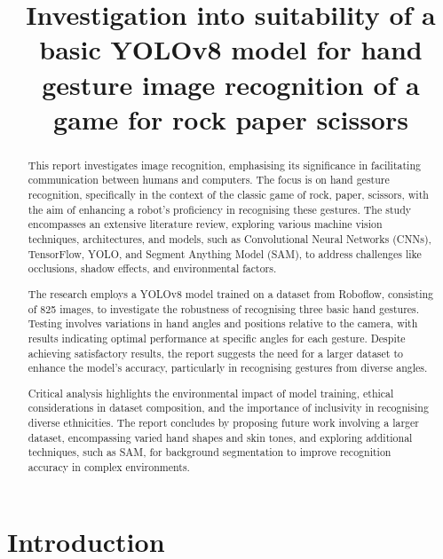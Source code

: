 \documentclass[conference]{IEEEtran}
\begin{document}
\title{Investigation into suitability of a basic YOLOv8 model for hand gesture image recognition of a game for rock paper scissors}

\author{
}

\maketitle

\begin{abstract}
This report investigates image recognition, emphasising its significance in facilitating communication between humans and computers. The focus is on hand gesture recognition, specifically in the context of the classic game of rock, paper, scissors, with the aim of enhancing a robot's proficiency in recognising these gestures. The study encompasses an extensive literature review, exploring various machine vision techniques, architectures, and models, such as Convolutional Neural Networks (CNNs), TensorFlow, YOLO, and Segment Anything Model (SAM), to address challenges like occlusions, shadow effects, and environmental factors.

The research employs a YOLOv8 model trained on a dataset from Roboflow, consisting of 825 images, to investigate the robustness of recognising three basic hand gestures. Testing involves variations in hand angles and positions relative to the camera, with results indicating optimal performance at specific angles for each gesture. Despite achieving satisfactory results, the report suggests the need for a larger dataset to enhance the model's accuracy, particularly in recognising gestures from diverse angles.

Critical analysis highlights the environmental impact of model training, ethical considerations in dataset composition, and the importance of inclusivity in recognising diverse ethnicities. The report concludes by proposing future work involving a larger dataset, encompassing varied hand shapes and skin tones, and exploring additional techniques, such as SAM, for background segmentation to improve recognition accuracy in complex environments.
\end{abstract}

\section{Introduction}
\end{document}
